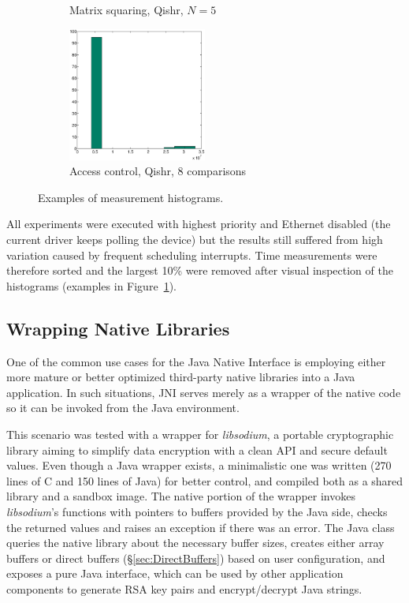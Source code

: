 \documentclass[a4paper,12pt,twoside,openright]{report}
\newcommand{\tool}[1]{\emph{#1}}
\newcommand{\lib}[1]{\tool{lib#1}}
\begin{document}
\begin{figure}[t!]
\begin{subfigure}{0.45\textwidth}
		\caption{Matrix squaring, Qishr, $N = 5$}
	\end{subfigure}
	\begin{subfigure}{0.90\textwidth}
		\centering
		\includegraphics[width=0.5\textwidth]{10_access.eps}
		\caption{Access control, Qishr, 8 comparisons}
	\end{subfigure}
	\caption{Examples of measurement histograms.}
	\label{fig:hist}
\end{figure}

All experiments were executed with highest priority and Ethernet disabled (the current driver keeps polling the device) but the results still suffered from high variation caused by frequent scheduling interrupts. Time measurements were therefore sorted and the largest 10\% were removed after visual inspection of the histograms (examples in Figure~\ref{fig:hist}). 

\subsection{Wrapping Native Libraries}

One of the common use cases for the Java Native Interface is employing either more mature or better optimized third-party native libraries into a Java application. In such situations, JNI serves merely as a wrapper of the native code so it can be invoked from the Java environment.

This scenario was tested with a wrapper for \lib{sodium}, a portable cryptographic library aiming to simplify data encryption with a clean API and secure default values. Even though a Java wrapper exists, a minimalistic one was written (270 lines of C and 150 lines of Java) for better control, and compiled both as a shared library and a sandbox image. The native portion of the wrapper invokes \lib{sodium}'s functions with pointers to buffers provided by the Java side, checks the returned values and raises an exception if there was an error. The Java class queries the native library about the necessary buffer sizes, creates either array buffers or direct buffers (\S\ref{sec:DirectBuffers}) based on user configuration, and exposes a pure Java interface, which can be used by other application components to generate RSA key pairs and encrypt/decrypt Java strings. 
\end{document}
